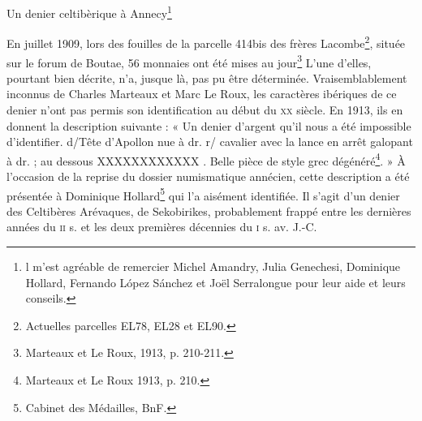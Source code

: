 
Un denier celtibèrique à Annecy\footnote{l m’est agréable de remercier Michel Amandry, Julia Genechesi,
 Dominique Hollard, Fernando López Sánchez et Joël
  Serralongue pour leur aide et leurs conseils.}


En juillet 1909, lors des fouilles de la parcelle 414bis des frères 
Lacombe\footnote{Actuelles parcelles EL78, EL28 et EL90.}, située sur le forum de
 Boutae, 56 monnaies ont été mises au jour\footnote{Marteaux et Le Roux, 1913, p. 210-211.}
L’une d’elles, pourtant bien décrite, n’a, jusque là, pas pu être déterminée. 
Vraisemblablement inconnus de Charles Marteaux et Marc Le Roux, les caractères ibériques
 de ce denier n’ont pas permis son identification au début du \textsc{xx} siècle.
 En 1913, ils en donnent la description suivante : « Un denier
 d’argent qu’il nous a été impossible d’identifier. d/Tête d’Apollon nue à dr.
 r/ cavalier avec la lance en arrêt galopant à dr. ; au dessous XXXXXXXXXXXX . Belle
 pièce de style grec dégénéré\footnote{Marteaux et Le Roux 1913, p. 210.}. »
 À l’occasion de la reprise du dossier numismatique annécien, cette description
 a été présentée à Dominique Hollard\footnote{Cabinet des Médailles, BnF.} qui l’a aisément identifiée.
 Il s’agit d’un denier des Celtibères Arévaques, de Sekobirikes, probablement frappé entre les dernières années du
\textsc{ii} s. et les deux premières décennies du \textsc{i} s. av. J.-C.


